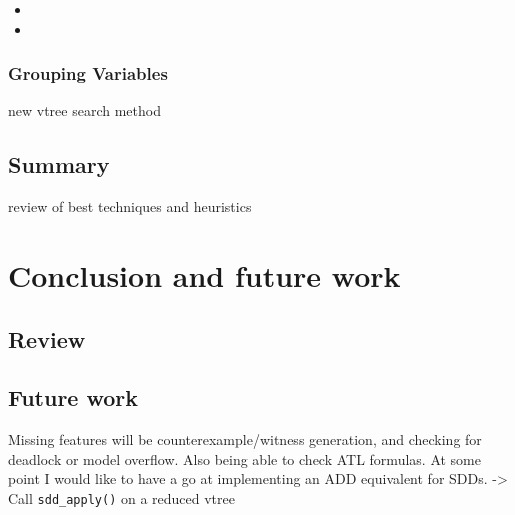 \documentclass[11pt]{article}
\begin{document}
\begin{itemize}
\item 
\item 
\end{itemize}

\subsubsection{Grouping Variables}
new vtree search method 
\subsection{Summary}

review of best techniques and heuristics

\section{Conclusion and future work}

\subsection{Review}

\subsection{Future work}

Missing features will be counterexample/witness generation, and checking for deadlock or model overflow. Also being able to check ATL formulas.
At some point I would like to have a go at implementing an ADD equivalent for SDDs.
-> Call \texttt{sdd\_apply()} on a reduced vtree
\end{document}
